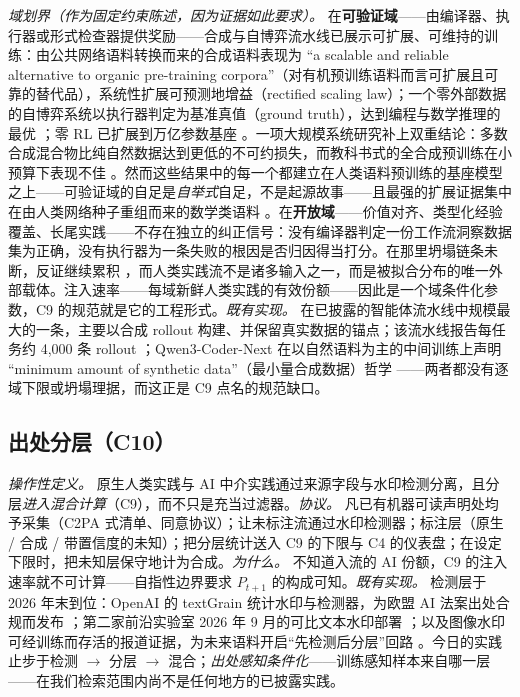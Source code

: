 \documentclass[10pt,fontset=fandol]{ctexart}
\begin{document}
\emph{域划界（作为固定约束陈述，因为证据如此要求）。} 在\textbf{可验证域}——由编译器、执行器或形式检查器提供奖励——合成与自博弈流水线已展示可扩展、可维持的训练：由公共网络语料转换而来的合成语料表现为 ``a scalable and reliable alternative to organic pre-training corpora''（对有机预训练语料而言可扩展且可靠的替代品），系统性扩展可预测地增益（rectified scaling law）\cite{ref36}；一个零外部数据的自博弈系统以执行器判定为基准真值（ground truth），达到编程与数学推理的最优 \cite{ref37}；零 RL 已扩展到万亿参数基座 \cite{ref38}。一项大规模系统研究补上双重结论：多数合成混合物比纯自然数据达到更低的不可约损失，而教科书式的全合成预训练在小预算下表现不佳 \cite{ref39}。然而这些结果中的每一个都建立在人类语料预训练的基座模型之上——可验证域的自足是\emph{自举式}自足，不是起源故事——且最强的扩展证据集中在由人类网络种子重组而来的数学类语料 \cite{ref36}。在\textbf{开放域}——价值对齐、类型化经验覆盖、长尾实践——不存在独立的纠正信号：没有编译器判定一份工作流洞察数据集为正确，没有执行器为一条失败的根因是否归因得当打分。在那里坍塌链条未断，反证继续累积 \cite{ref40}，而人类实践流不是诸多输入之一，而是被拟合分布的唯一外部载体。注入速率——每域新鲜人类实践的有效份额——因此是一个域条件化参数，C9 的规范就是它的工程形式。\emph{既有实现。} 在已披露的智能体流水线中规模最大的一条，主要以合成 rollout 构建、并保留真实数据的锚点；该流水线报告每任务约 4,000 条 rollout \cite{ref41}；Qwen3-Coder-Next 在以自然语料为主的中间训练上声明 ``minimum amount of synthetic data''（最小量合成数据）哲学 \cite{ref28}——两者都没有逐域下限或坍塌理据，而这正是 C9 点名的规范缺口。

\subsection{出处分层（C10）}

\emph{操作性定义。} 原生人类实践与 AI 中介实践通过来源字段与水印检测分离，且分层\emph{进入混合计算}（C9），而不只是充当过滤器。\emph{协议。} 凡已有机器可读声明处均予采集（C2PA 式清单、同意协议）；让未标注流通过水印检测器；标注层（原生 / 合成 / 带置信度的未知）；把分层统计送入 C9 的下限与 C4 的仪表盘；在设定下限时，把未知层保守地计为合成。\emph{为什么。} 不知道入流的 AI 份额，C9 的注入速率就不可计算——自指性边界要求 $P_{t+1}$ 的构成可知。\emph{既有实现。} 检测层于 2026 年末到位：OpenAI 的 textGrain 统计水印与检测器，为欧盟 AI 法案出处合规而发布 \cite{ref42}；第二家前沿实验室 2026 年 9 月的可比文本水印部署 \cite{ref43}；以及图像水印可经训练而存活的报道证据，为未来语料开启“先检测后分层”回路 \cite{ref44}。今日的实践止步于检测 $\to$ 分层 $\to$ 混合；\emph{出处感知条件化}——训练感知样本来自哪一层——在我们检索范围内尚不是任何地方的已披露实践。
\end{document}
